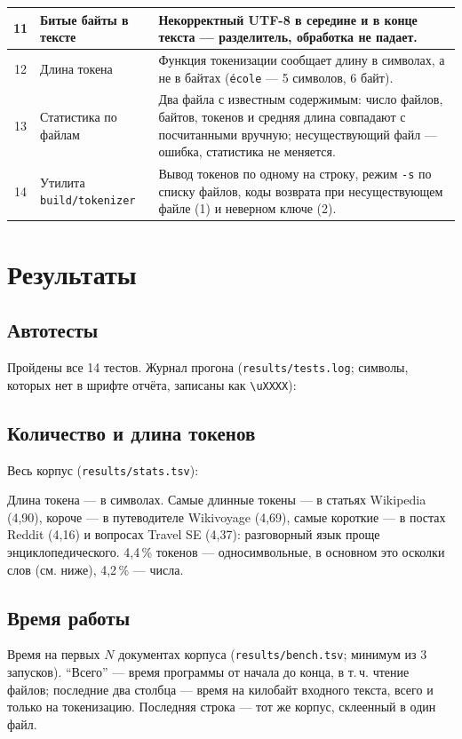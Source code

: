 \begin{center}
\begin{tabular}{|c|p{}|p{}|}
\hline
11 & Битые байты в тексте & Некорректный UTF-8 в середине и в конце текста --- разделитель, обработка не падает. \\
\hline
12 & Длина токена & Функция токенизации сообщает длину в символах, а не в байтах (\texttt{école} --- 5 символов, 6 байт). \\
\hline
13 & Статистика по файлам & Два файла с известным содержимым: число файлов, байтов, токенов и средняя длина совпадают с посчитанными вручную; несуществующий файл --- ошибка, статистика не меняется. \\
\hline
14 & Утилита \texttt{build/tokenizer} & Вывод токенов по одному на строку, режим \texttt{-s} по списку файлов, коды возврата при несуществующем файле (1) и неверном ключе (2). \\
\hline
\end{tabular}
\end{center}

\section{Результаты}
\subsection{Автотесты}
Пройдены все 14 тестов. Журнал прогона (\texttt{results/tests.log}; символы, которых нет в шрифте отчёта, записаны как \texttt{\textbackslash uXXXX}):

{\scriptsize
{}
}

\subsection{Количество и длина токенов}
Весь корпус (\texttt{results/stats.tsv}):
\begin{center}
\small

\end{center}
Длина токена --- в символах. Самые длинные токены --- в статьях Wikipedia (4,90), короче --- в путеводителе Wikivoyage (4,69), самые короткие --- в постах Reddit (4,16) и вопросах Travel SE (4,37): разговорный язык проще энциклопедического. 4,4\,\% токенов --- односимвольные, в основном это осколки слов (см. ниже), 4,2\,\% --- числа.

\subsection{Время работы}
Время на первых $N$ документах корпуса (\texttt{results/bench.tsv}; минимум из 3 запусков). \enquote{Всего} --- время программы от начала до конца, в т.\,ч. чтение файлов; последние два столбца --- время на килобайт входного текста, всего и только на токенизацию. Последняя строка --- тот же корпус, склеенный в один файл.
\begin{center}
\footnotesize

\end{center}

